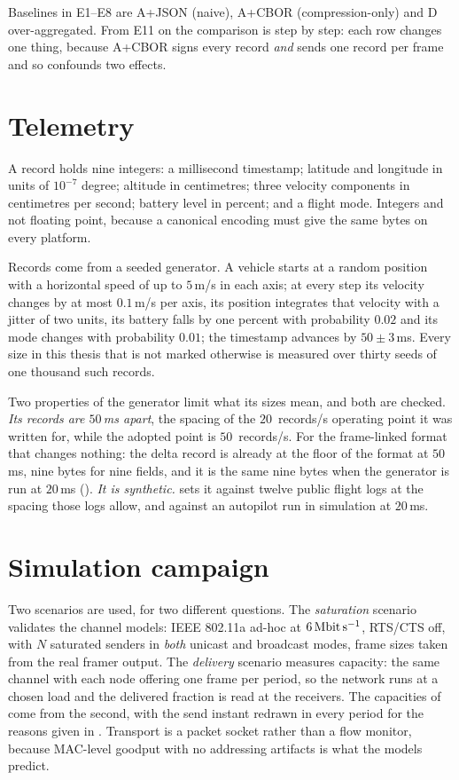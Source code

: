 Baselines in E1--E8 are A+JSON (naive), A+CBOR (compression-only) and D over-aggregated. From E11
on the comparison is step by step: each row changes one thing, because A+CBOR signs every
record \emph{and} sends one record per frame and so confounds two effects.

\section{Telemetry}\label{sec:telemetry}

A record holds nine integers: a millisecond timestamp; latitude and longitude in units of
$10^{-7}$ degree; altitude in centimetres; three velocity components in centimetres per second;
battery level in percent; and a flight mode. Integers and not floating point, because a
canonical encoding must give the same bytes on every platform.

Records come from a seeded generator. A vehicle starts at a random position with a horizontal
speed of up to $5$\,m/s in each axis; at every step its velocity changes by at most
$0.1$\,m/s per axis, its position integrates that velocity with a jitter of two units, its
battery falls by one percent with probability $0.02$ and its mode changes with probability
$0.01$; the timestamp advances by $50 \pm 3$\,ms. Every size in this thesis that is not
marked otherwise is measured over thirty seeds of one thousand such records.

Two properties of the generator limit what its sizes mean, and both are checked.
\emph{Its records are $50$\,ms apart}, the spacing of the $20$~records/s operating point it
was written for, while the adopted point is $50$~records/s. For the frame-linked format that changes
nothing: the delta record is already at the floor of the format at $50$\,ms, nine bytes for
nine fields, and it is the same nine bytes when the generator is run at $20$\,ms
(). \emph{It is synthetic.}  sets it against twelve public flight
logs at the spacing those logs allow, and against an autopilot run in simulation at $20$\,ms.

\section{Simulation campaign}\label{sec:simulation-campaign}

Two scenarios are used, for two different questions. The \emph{saturation} scenario validates the
channel models: IEEE 802.11a ad-hoc at $\SI{6}{\mega\bit\per\second}$, RTS/CTS off, with $N$
saturated senders in \emph{both} unicast and broadcast modes, frame sizes taken from the real
framer output. The \emph{delivery} scenario measures capacity: the same channel with each node
offering one frame per period, so the network runs at a chosen load and the delivered fraction is
read at the receivers. The capacities of  come from the second, with the send
instant redrawn in every period for the reasons given in . Transport is a packet socket rather than a flow monitor, because MAC-level
goodput with no addressing artifacts is what the models predict.

